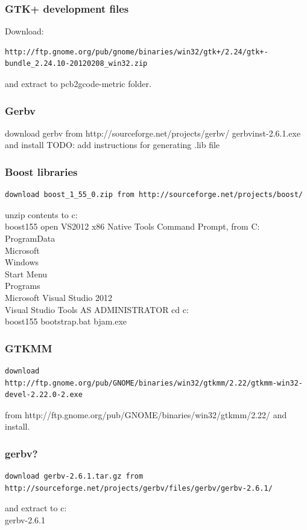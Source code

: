 \documentclass[a4paper,11pt]{article}  %
\begin{document}
\subsubsection{GTK+ development files}
Download:
\begin{lstlisting}[frame=single,breaklines=true]
http://ftp.gnome.org/pub/gnome/binaries/win32/gtk+/2.24/gtk+-bundle_2.24.10-20120208_win32.zip
\end{lstlisting}
and extract to pcb2gcode-metric folder.

\subsubsection{Gerbv}
download gerbv from http://sourceforge.net/projects/gerbv/
gerbvinst-2.6.1.exe and install
TODO: add instructions for generating .lib file

\subsubsection{Boost libraries}
\begin{lstlisting}[frame=single,breaklines=true]
download boost_1_55_0.zip from http://sourceforge.net/projects/boost/
\end{lstlisting}
unzip contents to c:\\boost155
open VS2012 x86 Native Tools Command Prompt, from C:\\ProgramData\\Microsoft\\Windows\\Start Menu\\Programs\\Microsoft Visual Studio 2012\\Visual Studio Tools
AS ADMINISTRATOR
cd c:\\boost155
bootstrap.bat
bjam.exe

\subsubsection{GTKMM}
\begin{lstlisting}[frame=single,breaklines=true]
download http://ftp.gnome.org/pub/GNOME/binaries/win32/gtkmm/2.22/gtkmm-win32-devel-2.22.0-2.exe
\end{lstlisting}
from http://ftp.gnome.org/pub/GNOME/binaries/win32/gtkmm/2.22/
and install.

\subsubsection{gerbv?}
\begin{lstlisting}[frame=single,breaklines=true]
download gerbv-2.6.1.tar.gz from http://sourceforge.net/projects/gerbv/files/gerbv/gerbv-2.6.1/
\end{lstlisting}
and extract to c:\\gerbv-2.6.1
\end{document}
